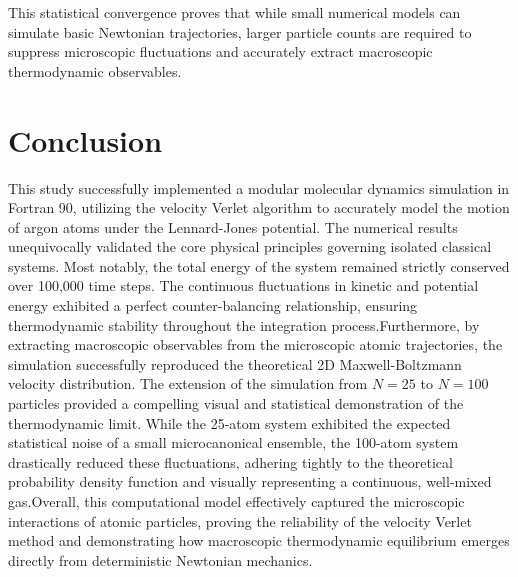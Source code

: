 \documentclass[12pt, a4paper, oneside]{article}
\begin{document}
        This statistical convergence proves that while small numerical models can simulate basic Newtonian trajectories, larger particle counts are required to suppress microscopic fluctuations and accurately extract macroscopic thermodynamic observables.

    \section{Conclusion}

        This study successfully implemented a modular molecular dynamics simulation in Fortran 90, utilizing the velocity Verlet algorithm to accurately model the motion of argon atoms under the Lennard-Jones potential. The numerical results unequivocally validated the core physical principles governing isolated classical systems. Most notably, the total energy of the system remained strictly conserved over 100,000 time steps. The continuous fluctuations in kinetic and potential energy exhibited a perfect counter-balancing relationship, ensuring thermodynamic stability throughout the integration process.Furthermore, by extracting macroscopic observables from the microscopic atomic trajectories, the simulation successfully reproduced the theoretical 2D Maxwell-Boltzmann velocity distribution. The extension of the simulation from $N=25$ to $N=100$ particles provided a compelling visual and statistical demonstration of the thermodynamic limit. While the 25-atom system exhibited the expected statistical noise of a small microcanonical ensemble, the 100-atom system drastically reduced these fluctuations, adhering tightly to the theoretical probability density function and visually representing a continuous, well-mixed gas.Overall, this computational model effectively captured the microscopic interactions of atomic particles, proving the reliability of the velocity Verlet method and demonstrating how macroscopic thermodynamic equilibrium emerges directly from deterministic Newtonian mechanics.
\end{document}
